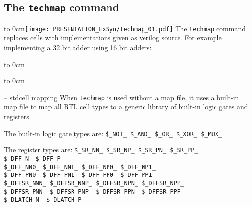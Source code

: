 
\subsection{The {\tt techmap} command}

\begin{frame}[t]{\subsecname}
\vbox to 0cm{\texttt{[image: PRESENTATION\_ExSyn/techmap\_01.pdf]}\vss}
\vskip-0.8cm
The {\tt techmap} command replaces cells with implementations given as
verilog source. For example implementing a 32 bit adder using 16 bit adders:

\vbox to 0cm{
\vskip-0.3cm

}\vbox to 0cm{
\vskip-0.5cm


}
\end{frame}

\begin{frame}[t]{\subsecname{} -- stdcell mapping}
When {\tt techmap} is used without a map file, it uses a built-in map file
to map all RTL cell types to a generic library of built-in logic gates and registers.

\bigskip
\begin{block}{The built-in logic gate types are:}
{\tt \$\_NOT\_ \$\_AND\_ \$\_OR\_ \$\_XOR\_ \$\_MUX\_}
\end{block}

\bigskip
\begin{block}{The register types are:}
{\tt \$\_SR\_NN\_ \$\_SR\_NP\_ \$\_SR\_PN\_ \$\_SR\_PP\_ \\
\$\_DFF\_N\_ \$\_DFF\_P\_ \\
\$\_DFF\_NN0\_ \$\_DFF\_NN1\_ \$\_DFF\_NP0\_ \$\_DFF\_NP1\_ \\
\$\_DFF\_PN0\_ \$\_DFF\_PN1\_ \$\_DFF\_PP0\_ \$\_DFF\_PP1\_ \\
\$\_DFFSR\_NNN\_ \$\_DFFSR\_NNP\_ \$\_DFFSR\_NPN\_ \$\_DFFSR\_NPP\_ \\
\$\_DFFSR\_PNN\_ \$\_DFFSR\_PNP\_ \$\_DFFSR\_PPN\_ \$\_DFFSR\_PPP\_ \\
\$\_DLATCH\_N\_ \$\_DLATCH\_P\_}
\end{block}
\end{frame}

